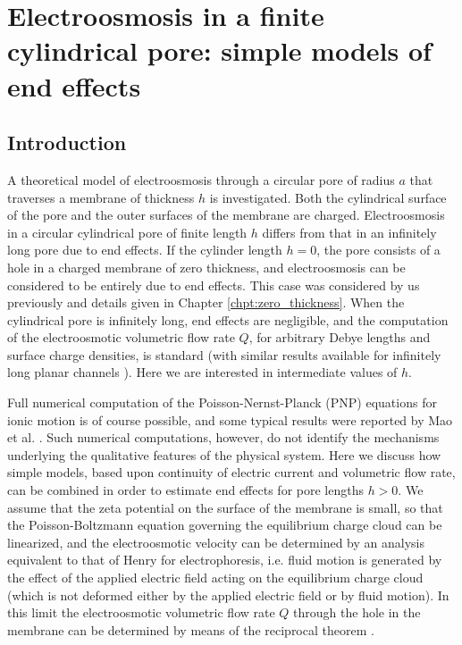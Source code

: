\chapter{Electroosmosis in a finite cylindrical pore: simple models of end effects}\label{chpt:finite_thickness}
\newcommand*\mycommand[1]{\texttt{\emph{#1}}}
\section{Introduction}
A theoretical model of electroosmosis through a circular pore of radius $a$ that traverses a membrane of thickness $h$ is investigated. Both the cylindrical surface of the pore and the outer surfaces of the membrane are charged. Electroosmosis in a circular cylindrical pore of finite length $h$ differs from that in an infinitely long pore due to end effects. If the cylinder length $h=0$, the pore consists of a hole in a charged membrane of zero thickness, and electroosmosis can be considered to be entirely due to end effects. This case was considered by us previously \cite{mao2014} and details given in Chapter \ref{chpt:zero_thickness}. When the cylindrical pore is infinitely long, end effects are negligible, and the computation of the electroosmotic volumetric flow rate $Q$, for arbitrary Debye lengths and surface charge densities, is standard\cite{rice1965,gross1968}
(with similar results available for infinitely long planar channels \cite{baldessari2008a,baldessari2008b}). Here we are interested in intermediate values of $h$. 

Full numerical computation of the Poisson-Nernst-Planck (PNP) equations for ionic motion is of course possible, and some typical results were reported by Mao et al. \cite{mao2014}. Such numerical computations, however, do not identify the mechanisms underlying the qualitative features of the physical system. Here we discuss how simple models, based upon continuity of electric current and volumetric flow rate, can be combined in order to estimate end effects for pore lengths $h>0$. We assume that the zeta potential on the surface of the membrane is small, so that the Poisson-Boltzmann equation governing the equilibrium charge cloud can be linearized, and the electroosmotic velocity can be determined by an analysis equivalent to that of Henry \cite{Henry_1931} for electrophoresis, i.e. fluid motion is generated by the effect of the applied electric field acting on the equilibrium charge cloud (which is not deformed either by the applied electric field or by fluid motion). In this limit the electroosmotic volumetric flow rate $Q$ through the hole in
the membrane can be determined by means of the reciprocal theorem \cite{mao2014}.

